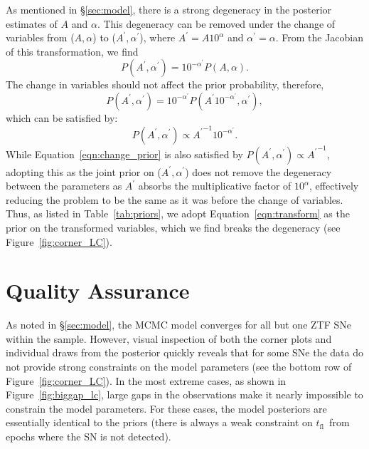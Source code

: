 \documentclass[twocolumn]{./aastex63}
\newcommand{\tfl}{$t_\mathrm{fl}$}
\begin{document}
As mentioned in \S\ref{sec:model}, there is a strong degeneracy in the
posterior estimates of $A$ and $\alpha$. This degeneracy can be removed under
the change of variables from ($A, \alpha$) to ($A^\prime, \alpha^\prime$),
where $A^\prime = A 10^\alpha$ and $\alpha^\prime = \alpha$. From the Jacobian
of this transformation, we find
$$P(A^\prime, \alpha^\prime) = 10^{-\alpha^\prime} P(A,\alpha).$$
The change in variables should not affect the prior probability, therefore,
\begin{equation} 
    P(A^\prime, \alpha^\prime) = 10^{-\alpha^\prime} P(A^\prime
10^{-\alpha^\prime},\alpha^\prime), 
\label{eqn:change_prior} 
\end{equation}
which can be satisfied by:
\begin{equation}
    P(A^\prime, \alpha^\prime) \propto {A^\prime}^{-1} 10^{-\alpha^\prime}.
\label{eqn:transform}
\end{equation}
While Equation~\ref{eqn:change_prior} is also satisfied by $P(A^\prime,
\alpha^\prime) \propto {A^\prime}^{-1}$, adopting this as the joint prior on
($A^\prime, \alpha^\prime$) does not remove the degeneracy between the
parameters as $A^\prime$ absorbs the multiplicative factor of $10^\alpha$,
effectively reducing the problem to be the same as it was before the change of
variables. Thus, as listed in Table~\ref{tab:priors}, we adopt
Equation~\ref{eqn:transform} as the prior on the transformed variables, which we
find breaks the degeneracy (see Figure~\ref{fig:corner_LC}).

\section{Quality Assurance}\label{sec:qa}

As noted in \S\ref{sec:model}, the MCMC model converges for all but one ZTF
SNe within the sample. However, visual inspection of both the corner plots and
individual draws from the posterior quickly reveals that for some SNe the data
do not provide strong constraints on the model parameters (see the bottom row
of Figure~\ref{fig:corner_LC}). In the most extreme cases, as shown in
Figure~\ref{fig:biggap_lc}, large gaps in the observations make it nearly
impossible to constrain the model parameters. For these cases, the model
posteriors are essentially identical to the priors (there is always a weak
constraint on \tfl\ from epochs where the SN is not detected).
\end{document}
